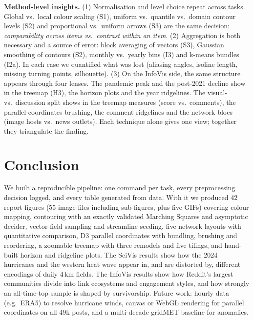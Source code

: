 \textbf{Method-level insights.}
(1) Normalisation and level choice repeat across tasks. Global vs.\ local colour scaling (S1), uniform vs.\ quantile vs.\
domain contour levels (S2) and proportional vs.\ uniform arrows (S3) are the same decision: \emph{comparability across
items vs.\ contrast within an item}.
(2) Aggregation is both necessary and a source of error: block averaging of vectors (S3), Gaussian smoothing of contours
(S2), monthly vs.\ yearly bins (I3) and k-means bundles (I2a). In each case we quantified what was lost (aliasing angles,
isoline length, missing turning points, silhouette).
(3) On the InfoVis side, the same structure appears through four lenses. The pandemic peak and the post-2021 decline show
in the treemap (H3), the horizon plots and the year ridgelines. The visual-vs.\ discussion split shows in the treemap
measures (score vs.\ comments), the parallel-coordinates brushing, the comment ridgelines and the network blocs (image
hosts vs.\ news outlets). Each technique alone gives one view; together they triangulate the finding.

\section{Conclusion}
We built a reproducible pipeline: one command per task, every preprocessing decision logged, and every table generated from
data. With it we produced 42 report figures (55 image files including sub-figures, plus five GIFs) covering colour mapping,
contouring with an exactly validated Marching Squares and asymptotic decider, vector-field sampling and streamline seeding,
five network layouts with quantitative comparison, D3 parallel coordinates with bundling, brushing and reordering, a
zoomable treemap with three remodels and five tilings, and hand-built horizon and ridgeline plots. The SciVis results show
how the 2024 hurricanes and the western heat wave appear in, and are distorted by, different encodings of daily 4\,km
fields. The InfoVis results show how Reddit's largest communities divide into link ecosystems and engagement styles, and
how strongly an all-time-top sample is shaped by survivorship. Future work: hourly data (e.g.\ ERA5) to resolve
hurricane winds, canvas or WebGL rendering for parallel coordinates on all 49k posts, and a multi-decade gridMET baseline for
anomalies.
